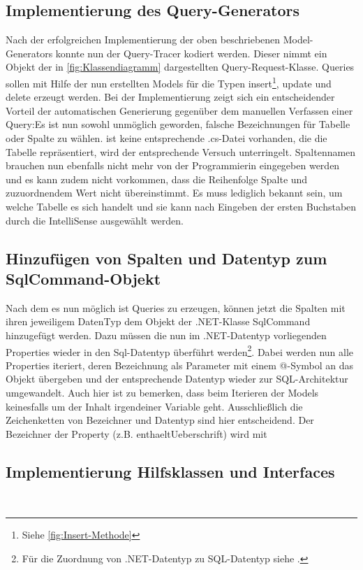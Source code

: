\documentclass[11pt,toc=sectionentrywithoutdots, 
headheight=44pt, headings=optiontoheadandtoc, hyperfootnotes=false, hypertexnames=false]{scrartcl}
\newcommand\extendedref[1]{Siehe \ref{#1}}
\begin{document}
\subsection{Implementierung des Query-Generators}
Nach der erfolgreichen Implementierung der oben beschriebenen Model-Generators konnte nun der Query-Tracer kodiert werden. Dieser nimmt ein Objekt der in \ref{fig:Klassendiagramm} dargestellten Query-Request-Klasse. Queries sollen mit Hilfe der nun erstellten Models für die Typen \glqq insert\footnote{\extendedref{fig:Insert-Methode}}\grqq{}, \glqq update \grqq{} und \glqq delete \grqq{} erzeugt werden. Bei der Implementierung zeigt sich ein entscheidender Vorteil der automatischen Generierung gegenüber dem manuellen Verfassen einer Query:\newline Es ist nun sowohl unmöglich geworden, falsche Bezeichnungen für Tabelle oder Spalte zu wählen. ist keine entsprechende .cs-Datei vorhanden, die die Tabelle repräsentiert, wird der entsprechende Versuch unterringelt. Spaltennamen brauchen nun ebenfalls nicht mehr von der Programmierin eingegeben werden und es kann zudem nicht vorkommen, dass die Reihenfolge Spalte und zuzuordnendem Wert nicht übereinstimmt. Es muss lediglich bekannt sein, um welche Tabelle es sich handelt und sie kann nach Eingeben der ersten Buchstaben durch die \gls{IntelliSense} ausgewählt werden.

\subsection{Hinzufügen von Spalten und Datentyp zum SqlCommand-Objekt}
Nach dem es nun möglich ist Queries zu erzeugen, können jetzt die Spalten mit ihren jeweiligem DatenTyp dem Objekt der .NET-Klasse SqlCommand hinzugefügt werden. Dazu müssen die nun im .NET-Datentyp vorliegenden Properties wieder in den Sql-Datentyp überführt werden\footnote{Für die Zuordnung von .NET-Datentyp zu SQL-Datentyp siehe \cite{Microsoft2021}.}. Dabei werden nun alle Properties iteriert, deren Bezeichnung als Parameter mit einem @-Symbol an das Objekt übergeben und der entsprechende Datentyp wieder zur SQL-Architektur umgewandelt. Auch hier ist zu bemerken, dass beim Iterieren der Models keinesfalls um der Inhalt irgendeiner Variable geht. Ausschließlich die Zeichenketten von Bezeichner und Datentyp sind hier entscheidend. Der Bezeichner der Property (z.B. \glqq enthaeltUeberschrift\grqq{}) wird mit

\subsection{Implementierung Hilfsklassen und Interfaces}
\blindtext\
\end{document}
